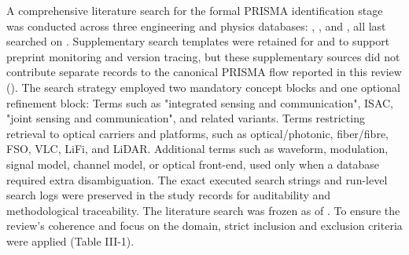 {}
\markdownRendererSectionEnd \markdownRendererSectionBegin
{}\markdownRendererInterblockSeparator
{}A comprehensive literature search for the formal PRISMA identification stage was conducted across three engineering and physics databases: , , and , all last searched on . Supplementary search templates were retained for  and  to support preprint monitoring and version tracing, but these supplementary sources did not contribute separate records to the canonical PRISMA flow reported in this review ().\markdownRendererParagraphSeparator
{}The search strategy employed two mandatory concept blocks and one optional refinement block:\markdownRendererInterblockSeparator
{}\markdownRendererOlBeginTight
{} Terms such as "integrated sensing and communication", ISAC, "joint sensing and communication", and related variants.\markdownRendererOlItemEnd 
{} Terms restricting retrieval to optical carriers and platforms, such as optical/photonic, fiber/fibre, FSO, VLC, LiFi, and LiDAR.\markdownRendererOlItemEnd 
{} Additional terms such as waveform, modulation, signal model, channel model, or optical front-end, used only when a database required extra disambiguation.\markdownRendererOlItemEnd 
\markdownRendererOlEndTight \markdownRendererInterblockSeparator
{}The exact executed search strings and run-level search logs were preserved in the study records for auditability and methodological traceability. The literature search was frozen as of .\markdownRendererInterblockSeparator
{}
\markdownRendererSectionEnd \markdownRendererSectionBegin
{}\markdownRendererInterblockSeparator
{}To ensure the review's coherence and focus on the  domain, strict inclusion and exclusion criteria were applied (Table III-1).\markdownRendererParagraphSeparator

